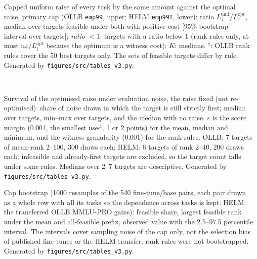 \documentclass{article}
\begin{document}
\begin{table}[h]
\caption{Capped uniform raise of every task by the same amount against the optimal raise, primary cap (OLLB \texttt{emp99}, upper; HELM \texttt{emp99T}, lower): ratio $L_1^{\text{unif}}/L_1^{\text{opt}}$, median over targets feasible under both with positive cost [95\% bootstrap interval over targets]; \emph{ratio $<1$}: targets with a ratio below 1 (rank rules only, at most $n\varepsilon/L_1^{\text{opt}}$ because the optimum is a witness cost); $K$: medians. $^\dagger$: OLLB rank rules cover the 50 best targets only. The sets of feasible targets differ by rule. Generated by \texttt{figures/src/tables\_v3.py}.}
\label{tab:T6}
\centering\scriptsize
\\[4pt]

\end{table}

\begin{table}[h]
\caption{Survival of the optimised raise under evaluation noise, the raise fixed (not re-optimised): share of noise draws in which the target is still strictly first; median over targets, min--max over targets, and the median with no raise. $\varepsilon$ is the score margin (0.001, the smallest used, 1 or 2 points) for the mean, median and minimum, and the witness granularity (0.001) for the rank rules. OLLB: 7 targets of mean-rank 2--100, 300 draws each; HELM: 6 targets of rank 2--40, 200 draws each; infeasible and already-first targets are excluded, so the target count falls under some rules. Medians over 2--7 targets are descriptive. Generated by \texttt{figures/src/tables\_v3.py}.}
\label{tab:T7}
\centering\scriptsize

\end{table}

\begin{table}[h]
\caption{Cap bootstrap (1000 resamples of the 540 fine-tune/base pairs, each pair drawn as a whole row with all its tasks so the dependence across tasks is kept; HELM: the transferred OLLB MMLU-PRO gains): feasible share, largest feasible rank under the mean and all-feasible prefix, observed value with the 2.5--97.5 percentile interval. The intervals cover sampling noise of the cap only, not the selection bias of published fine-tunes or the HELM transfer; rank rules were not bootstrapped. Generated by \texttt{figures/src/tables\_v3.py}.}
\label{tab:T8}
\centering\scriptsize

\end{table}
\end{document}
